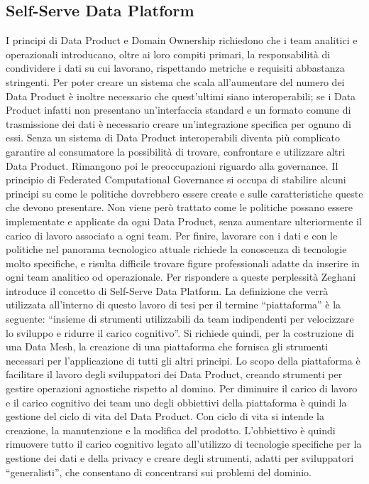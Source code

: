 \documentclass[a4paper,12pt]{report}
\begin{document}
\subsection{Self-Serve Data Platform}\label{self-serve data platform}
I principi di Data Product e Domain Ownership richiedono che i team analitici e operazionali introducano, oltre ai loro compiti primari, la responsabilità di condividere i dati su cui lavorano, rispettando metriche e requisiti abbastanza stringenti.
Per poter creare un sistema che scala all'aumentare del numero dei Data Product è inoltre necessario che quest'ultimi siano interoperabili; se i Data Product infatti non presentano un'interfaccia standard e un formato comune di trasmissione dei dati è necessario creare un'integrazione specifica per ognuno di essi. 
Senza un sistema di Data Product interoperabili diventa più complicato garantire al consumatore la possibilità di trovare, confrontare e utilizzare altri Data Product.
Rimangono poi le preoccupazioni riguardo alla governance.
Il principio di Federated Computational Governance si occupa di stabilire alcuni principi su come le politiche dovrebbero essere create e sulle caratteristiche queste che devono presentare.
Non viene però trattato come le politiche possano essere implementate e applicate da ogni Data Product, senza aumentare ulteriormente il carico di lavoro associato a ogni team.
Per finire, lavorare con i dati e con le politiche nel panorama tecnologico attuale richiede la conoscenza di tecnologie molto specifiche, e risulta difficile trovare figure professionali adatte da inserire in ogni team analitico od operazionale.
Per rispondere a queste perplessità Zeghani introduce il concetto di Self-Serve Data Platform.
La definizione che verrà utilizzata all'interno di questo lavoro di tesi per il termine ``piattaforma'' è la seguente: ``insieme di strumenti utilizzabili da team indipendenti per velocizzare lo sviluppo e ridurre il carico cognitivo''.
Si richiede quindi, per la costruzione di una Data Mesh, la creazione di una piattaforma che fornisca gli strumenti necessari per l'applicazione di tutti gli altri principi.
Lo scopo della piattaforma è facilitare il lavoro degli sviluppatori dei Data Product, creando strumenti per gestire operazioni agnostiche rispetto al domino.
Per diminuire il carico di lavoro e il carico cognitivo dei team uno degli obbiettivi della piattaforma è quindi la gestione del ciclo di vita del Data Product.
Con ciclo di vita si intende la creazione, la manutenzione e la modifica del prodotto.
L'obbiettivo è quindi rimuovere tutto il carico cognitivo legato all'utilizzo di tecnologie specifiche per la gestione dei dati e della privacy e creare degli strumenti, adatti per sviluppatori ``generalisti'', che consentano di concentrarsi sui problemi del dominio.
\end{document}
